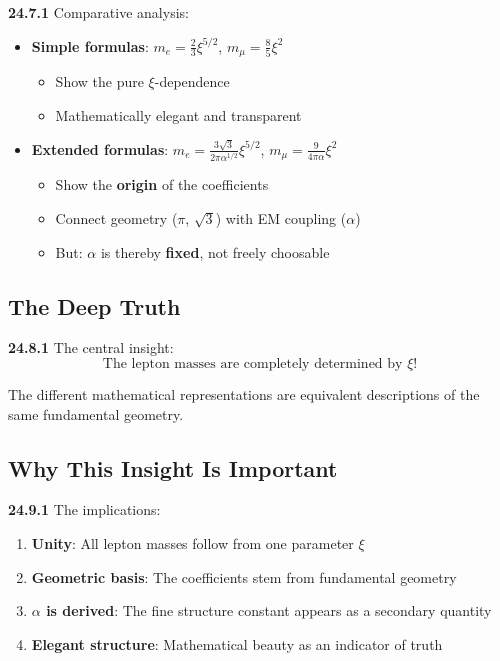 \documentclass[12pt,a4paper]{article}
\begin{document}
\noindent \textbf{24.7.1} Comparative analysis:
\begin{itemize}
	\item \textbf{Simple formulas}: $m_e = \frac{2}{3}\xi^{5/2}$, $m_\mu = \frac{8}{5}\xi^2$
	\begin{itemize}
		\item Show the pure $\xi$-dependence
		\item Mathematically elegant and transparent
	\end{itemize}
	
	\item \textbf{Extended formulas}: $m_e = \frac{3\sqrt{3}}{2\pi\alpha^{1/2}}\xi^{5/2}$, $m_\mu = \frac{9}{4\pi\alpha}\xi^2$
	\begin{itemize}
		\item Show the \textbf{origin} of the coefficients
		\item Connect geometry ($\pi$, $\sqrt{3}$) with EM coupling ($\alpha$)
		\item But: $\alpha$ is thereby \textbf{fixed}, not freely choosable
	\end{itemize}
\end{itemize}

\subsection{The Deep Truth}

\noindent \textbf{24.8.1} The central insight:
\[
\boxed{
	\text{The lepton masses are completely determined by } \xi \text{!}
}
\]

The different mathematical representations are equivalent descriptions of the same fundamental geometry.

\subsection{Why This Insight Is Important}

\noindent \textbf{24.9.1} The implications:
\begin{enumerate}
	\item \textbf{Unity}: All lepton masses follow from one parameter $\xi$
	\item \textbf{Geometric basis}: The coefficients stem from fundamental geometry
	\item \textbf{$\alpha$ is derived}: The fine structure constant appears as a secondary quantity
	\item \textbf{Elegant structure}: Mathematical beauty as an indicator of truth
\end{enumerate}
\end{document}
